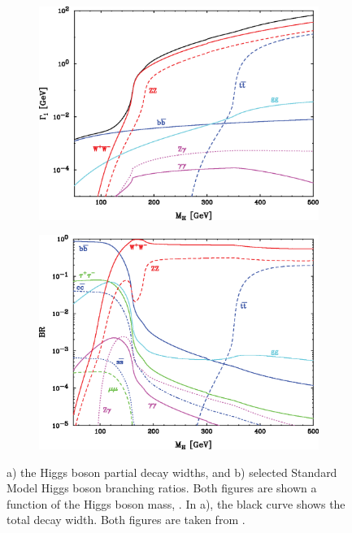 \begin{figure}[tbph]
\centering
    \begin{subfigure}[b]{0.45\textwidth}
        \includegraphics[width=\textwidth]{theory/HiggsDecayWidth}
        \caption{}
        \label{fig:theoryHiggsDecayWidth}
    \end{subfigure}
    \begin{subfigure}[b]{0.45\textwidth}
        \includegraphics[width=\textwidth]{theory/HiggsBranchingRatio}
        \caption{}
        \label{fig:theoryHiggsBranchingRatio}
    \end{subfigure}
\caption[SM Higgs boson decay width and branching ratios]%
{a) the Higgs boson partial decay widths, and b) selected Standard Model Higgs boson branching ratios. Both figures are shown a function of the Higgs boson mass, \Hmass. In a), the black curve shows the total decay width. Both figures are taken from \cite{Rainwater:2007cp}.}
\label{fig:theoryHiggsPhenomenology}
\end{figure}


